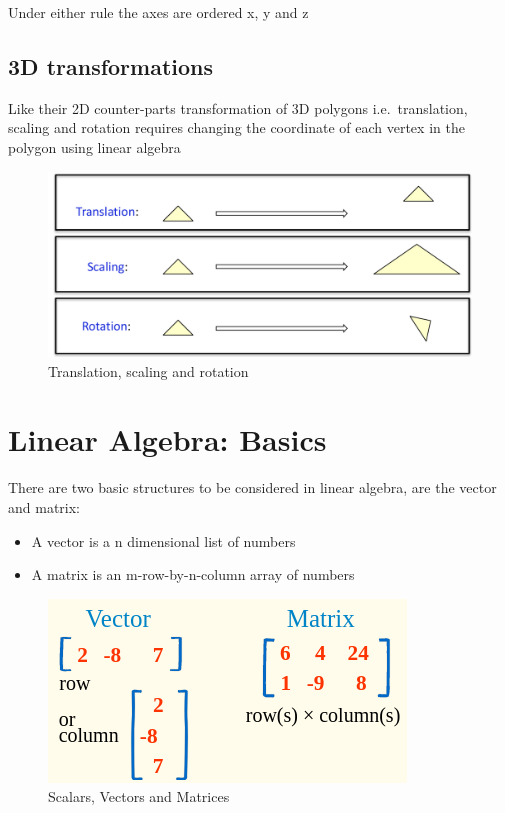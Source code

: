 \documentclass[
]{book}
\providecommand{\tightlist}{%
  \setlength{\itemsep}{0pt}\setlength{\parskip}{0pt}}
\begin{document}
Under either rule the axes are ordered x, y and z

\hypertarget{d-transformations}{%
\subsection{3D transformations}\label{d-transformations}}

Like their 2D counter-parts transformation of 3D polygons i.e.~{translation, scaling and rotation} requires changing the coordinate of each vertex in the polygon using {linear algebra}

\begin{figure}
\centering
\includegraphics{img/08-image06.png}
\caption{\label{fig:3d-transform}Translation, scaling and rotation}
\end{figure}

\hypertarget{linear-algebra-basics}{%
\section{Linear Algebra: Basics}\label{linear-algebra-basics}}

There are two basic structures to be considered in linear algebra, are the vector and matrix:

\begin{itemize}
\tightlist
\item
  A {vector} is a n dimensional list of numbers
\item
  A {matrix} is an m-row-by-n-column array of numbers
\end{itemize}

\begin{figure}
\centering
\includegraphics{img/08-image07.png}
\caption{\label{fig:vectors}Scalars, Vectors and Matrices}
\end{figure}
\end{document}
